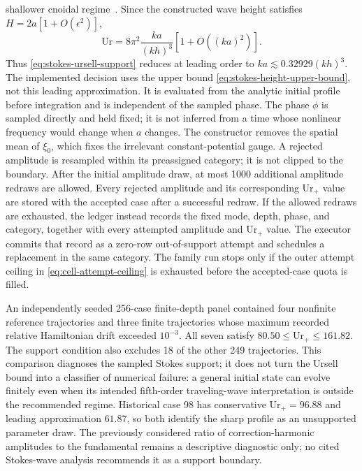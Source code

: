 \documentclass[11pt]{article}
\begin{document}
shallower cnoidal regime~\cite{zhao2024}.  Since the constructed wave height
satisfies $H=2a[1+O(\epsilon^2)]$,
\begin{equation}
  \mathrm{Ur}
  =
  8\pi^2\frac{ka}{(kh)^3}[1+O((ka)^2)].
  \label{eq:stokes-ursell-leading}
\end{equation}
Thus \eqref{eq:stokes-ursell-support} reduces at leading order to
$ka\lesssim0.32929(kh)^3$.  The implemented decision uses the upper bound
\eqref{eq:stokes-height-upper-bound}, not this leading approximation.  It is
evaluated from the analytic initial profile before integration and is
independent of the sampled phase.  The phase $\phi$ is sampled directly and
held fixed; it is not inferred from a time whose nonlinear frequency would
change when $a$ changes.  The constructor removes the spatial mean of
$\xi_0$, which fixes the irrelevant constant-potential gauge.
A rejected amplitude is resampled within
its preassigned category; it is not clipped to the boundary.  After the initial
amplitude draw, at most 1000 additional amplitude redraws are allowed.  Every rejected
amplitude and its corresponding $\mathrm{Ur}_+$ value are stored with the
accepted case after a successful redraw.  If the allowed redraws are
exhausted, the ledger instead records the fixed mode, depth, phase, and category,
together with every attempted amplitude and $\mathrm{Ur}_+$ value.  The
executor commits that record as a zero-row out-of-support attempt and
schedules a replacement in the same category.  The family run stops only if the
outer attempt ceiling in \eqref{eq:cell-attempt-ceiling} is exhausted before
the accepted-case quota is filled.

An independently seeded 256-case finite-depth panel contained four nonfinite
reference trajectories and three finite trajectories whose maximum recorded
relative Hamiltonian drift exceeded \(10^{-3}\).  All seven satisfy
$80.50\leq\mathrm{Ur}_+\leq161.82$.  The support condition also excludes 18
of the other 249 trajectories.  This comparison diagnoses the sampled
Stokes support; it does not turn the Ursell bound into a classifier of
numerical failure:
a general initial state can evolve finitely even when its intended
fifth-order traveling-wave interpretation is outside the recommended
regime.  Historical case 98 has conservative
$\mathrm{Ur}_+=96.88$ and leading
approximation $61.87$, so both identify the sharp profile as an unsupported
parameter draw.  The previously considered ratio of correction-harmonic
amplitudes to the fundamental remains a descriptive diagnostic only; no cited
Stokes-wave analysis recommends it as a support boundary.
\end{document}
